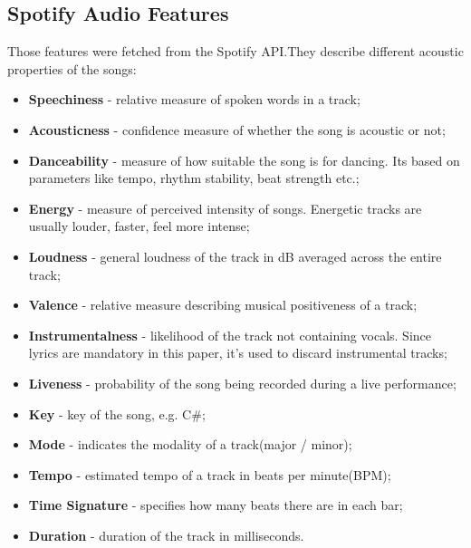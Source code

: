 \subsection{Spotify Audio Features}
\label{sec:spotifyaudiofeatures}
Those features were fetched from the Spotify API.They describe different
acoustic properties of the songs:
\begin{itemize}
  \item \textbf{Speechiness} - relative measure of spoken words in a track;
  \item \textbf{Acousticness} - confidence measure of whether the song is
    acoustic or not;
  \item \textbf{Danceability} - measure of how suitable the song is for
    dancing. Its based on parameters like tempo, rhythm stability, beat
    strength etc.;
  \item \textbf{Energy} - measure of perceived intensity of songs. Energetic
    tracks are usually louder, faster, feel more intense;
  \item \textbf{Loudness} - general loudness of the  track in dB averaged
    across the entire track;
  \item \textbf{Valence} - relative measure describing musical positiveness of
    a track;
  \item \textbf{Instrumentalness} - likelihood of the track not containing
    vocals. Since lyrics are mandatory in this paper, it's used to discard
    instrumental tracks;
  \item \textbf{Liveness} - probability of the song being recorded during a
    live performance;
  \item \textbf{Key} - key of the song, e.g. C\#;
  \item \textbf{Mode} - indicates the modality of a track(major / minor);
  \item \textbf{Tempo} - estimated tempo of a track in beats per minute(BPM);
  \item \textbf{Time Signature} - specifies how many beats there are in each
    bar;
  \item \textbf{Duration} - duration of the track in milliseconds.
\end{itemize}


